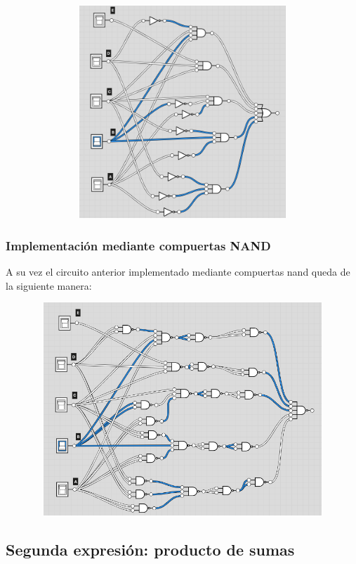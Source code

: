 \begin{figure}[H]
\centering
\includegraphics[width=12cm,height=8cm]{Ejercicio_2/circuitos/Ej2_parte1_logicly.png}
\end{figure}

\subsubsection{Implementación mediante compuertas NAND}
A su vez el circuito anterior implementado mediante compuertas nand queda de la siguiente manera:

\begin{figure}[H]
\centering
\includegraphics[width=12cm,height=8cm]{Ejercicio_2/circuitos/Ej2_parte1_nand_logicly.png}
\end{figure}



\subsection{Segunda expresión: producto de sumas}

